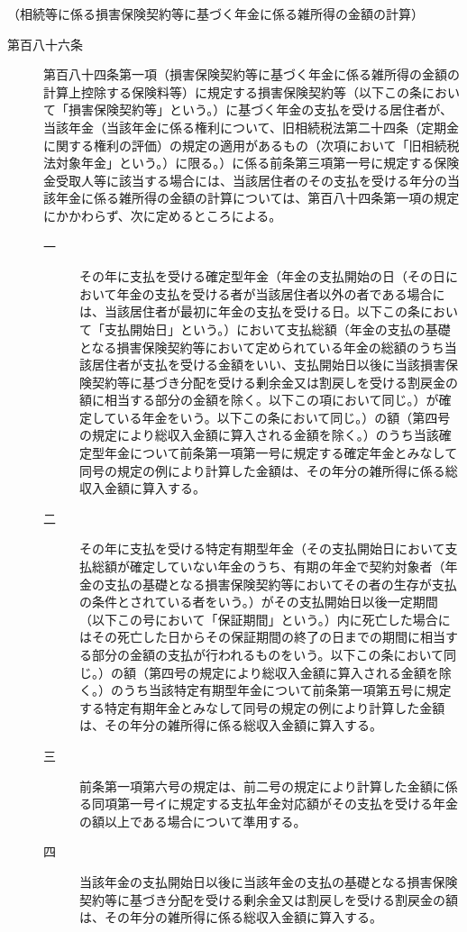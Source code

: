 \documentclass[twocolumn,a4j,10pt]{ltjtarticle}
\begin{document}
\noindent\hspace{10pt}（相続等に係る損害保険契約等に基づく年金に係る雑所得の金額の計算）
\begin{description}
\item[第百八十六条]第百八十四条第一項（損害保険契約等に基づく年金に係る雑所得の金額の計算上控除する保険料等）に規定する損害保険契約等（以下この条において「損害保険契約等」という。）に基づく年金の支払を受ける居住者が、当該年金（当該年金に係る権利について、旧相続税法第二十四条（定期金に関する権利の評価）の規定の適用があるもの（次項において「旧相続税法対象年金」という。）に限る。）に係る前条第三項第一号に規定する保険金受取人等に該当する場合には、当該居住者のその支払を受ける年分の当該年金に係る雑所得の金額の計算については、第百八十四条第一項の規定にかかわらず、次に定めるところによる。
\begin{description}
\item[一]その年に支払を受ける確定型年金（年金の支払開始の日（その日において年金の支払を受ける者が当該居住者以外の者である場合には、当該居住者が最初に年金の支払を受ける日。以下この条において「支払開始日」という。）において支払総額（年金の支払の基礎となる損害保険契約等において定められている年金の総額のうち当該居住者が支払を受ける金額をいい、支払開始日以後に当該損害保険契約等に基づき分配を受ける剰余金又は割戻しを受ける割戻金の額に相当する部分の金額を除く。以下この項において同じ。）が確定している年金をいう。以下この条において同じ。）の額（第四号の規定により総収入金額に算入される金額を除く。）のうち当該確定型年金について前条第一項第一号に規定する確定年金とみなして同号の規定の例により計算した金額は、その年分の雑所得に係る総収入金額に算入する。
\item[二]その年に支払を受ける特定有期型年金（その支払開始日において支払総額が確定していない年金のうち、有期の年金で契約対象者（年金の支払の基礎となる損害保険契約等においてその者の生存が支払の条件とされている者をいう。）がその支払開始日以後一定期間（以下この号において「保証期間」という。）内に死亡した場合にはその死亡した日からその保証期間の終了の日までの期間に相当する部分の金額の支払が行われるものをいう。以下この条において同じ。）の額（第四号の規定により総収入金額に算入される金額を除く。）のうち当該特定有期型年金について前条第一項第五号に規定する特定有期年金とみなして同号の規定の例により計算した金額は、その年分の雑所得に係る総収入金額に算入する。
\item[三]前条第一項第六号の規定は、前二号の規定により計算した金額に係る同項第一号イに規定する支払年金対応額がその支払を受ける年金の額以上である場合について準用する。
\item[四]当該年金の支払開始日以後に当該年金の支払の基礎となる損害保険契約等に基づき分配を受ける剰余金又は割戻しを受ける割戻金の額は、その年分の雑所得に係る総収入金額に算入する。

\end{description}
\end{description}
\end{document}
